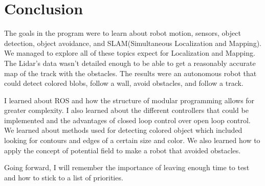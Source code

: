 \documentclass[journal, a4paper]{IEEEtran}
\begin{document}
\section{Conclusion}
\par The goals in the program were to learn about robot motion, sensors, object detection, object avoidance, and SLAM(Simultaneous Localization and Mapping). We managed to explore all of these topics expect for Localization and Mapping. The Lidar's data wasn't detailed enough to be able to get a reasonably accurate map of the track with the obstacles. The results were an autonomous robot that could detect colored blobs, follow a wall, avoid obstacles, and follow a track. 
\par I learned about ROS and how the structure of modular programming allows for greater complexity. I also learned about the different controllers that could be implemented and the advantages of closed loop control over open loop control. We learned about methods used for detecting colored object which included looking for contours and edges of a certain size and color. We also learned how to apply the concept of potential field to make a robot that avoided obstacles. 

\par Going forward, I will remember the importance of leaving enough time to test and how to stick to a list of priorities. 

\nocite{5}



\end{document}
